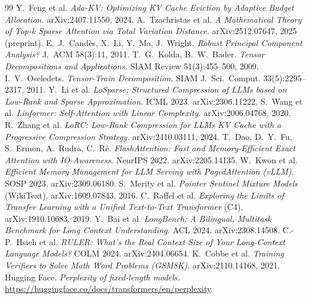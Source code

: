 \documentclass[11pt]{article}
\begin{document}
\begin{thebibliography}{99}
 Y.~Feng et al. \emph{Ada-KV: Optimizing KV Cache Eviction by Adaptive Budget Allocation.} arXiv:2407.11550, 2024.
 A.~Tzachristas et al. \emph{A Mathematical Theory of Top-k Sparse Attention via Total Variation Distance.} arXiv:2512.07647, 2025 (preprint).
 E.~J.~Cand\`es, X.~Li, Y.~Ma, J.~Wright. \emph{Robust Principal Component Analysis?} J.~ACM 58(3):11, 2011.
 T.~G.~Kolda, B.~W.~Bader. \emph{Tensor Decompositions and Applications.} SIAM Review 51(3):455--500, 2009.
 I.~V.~Oseledets. \emph{Tensor-Train Decomposition.} SIAM J.~Sci.~Comput. 33(5):2295--2317, 2011.
 Y.~Li et al. \emph{LoSparse: Structured Compression of LLMs based on Low-Rank and Sparse Approximation.} ICML 2023. arXiv:2306.11222.
 S.~Wang et al. \emph{Linformer: Self-Attention with Linear Complexity.} arXiv:2006.04768, 2020.
 R.~Zhang et al. \emph{LoRC: Low-Rank Compression for LLMs KV Cache with a Progressive Compression Strategy.} arXiv:2410.03111, 2024.
 T.~Dao, D.~Y.~Fu, S.~Ermon, A.~Rudra, C.~R\'e. \emph{FlashAttention: Fast and Memory-Efficient Exact Attention with IO-Awareness.} NeurIPS 2022. arXiv:2205.14135.
 W.~Kwon et al. \emph{Efficient Memory Management for LLM Serving with PagedAttention (vLLM).} SOSP 2023. arXiv:2309.06180.
 S.~Merity et al. \emph{Pointer Sentinel Mixture Models} (WikiText). arXiv:1609.07843, 2016.
 C.~Raffel et al. \emph{Exploring the Limits of Transfer Learning with a Unified Text-to-Text Transformer} (C4). arXiv:1910.10683, 2019.
 Y.~Bai et al. \emph{LongBench: A Bilingual, Multitask Benchmark for Long Context Understanding.} ACL 2024. arXiv:2308.14508.
 C.-P.~Hsieh et al. \emph{RULER: What's the Real Context Size of Your Long-Context Language Models?} COLM 2024. arXiv:2404.06654.
 K.~Cobbe et al. \emph{Training Verifiers to Solve Math Word Problems (GSM8K).} arXiv:2110.14168, 2021.
 Hugging Face. \emph{Perplexity of fixed-length models.} \url{https://huggingface.co/docs/transformers/en/perplexity}.
\end{thebibliography}
\end{document}
